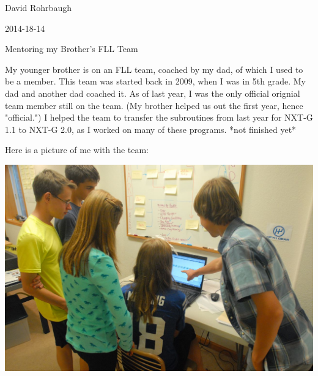 David Rohrbaugh

2014-18-14

Mentoring my Brother's FLL Team

\medskip

My younger brother is on an FLL team, coached by my dad, of which I used to be a member. This team was started back in 2009, when I was in 5th grade. My dad and another dad coached it. As of last year, I was the only official orignial team member still on the team. (My brother helped us out the first year, hence "official.") I helped the team to transfer the subroutines from last year for NXT-G 1.1 to NXT-G 2.0, as I worked on many of these programs. *not finished yet*

\medskip

Here is a picture of me with the team:

\begin{center}
 \includegraphics[width=\textwidth]{./Entries/Images/mentoring.jpg}
\end{center}
